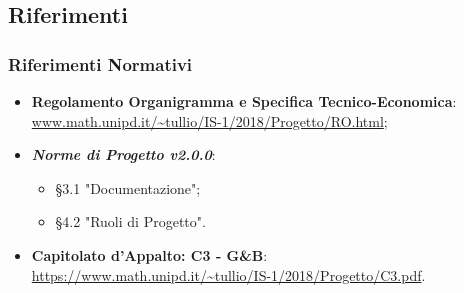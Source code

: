\subsection{Riferimenti}
\subsubsection{Riferimenti Normativi}
\begin{itemize}
	\item \textbf{Regolamento Organigramma e Specifica Tecnico-Economica}:\-\\ \url{www.math.unipd.it/~tullio/IS-1/2018/Progetto/RO.html};
	\item \textbf{\textit{Norme di Progetto v2.0.0}}:
		\begin{itemize}
			\item §3.1 "Documentazione";
			\item §4.2 "Ruoli di Progetto".
		\end{itemize}
	\item \textbf{Capitolato d'Appalto: C3 - G\&B}:\-\\ \url{https://www.math.unipd.it/~tullio/IS-1/2018/Progetto/C3.pdf}.
\end{itemize}

